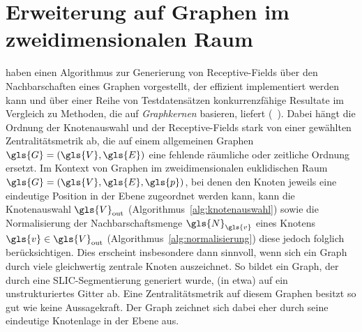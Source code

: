 \section{Erweiterung auf Graphen im zweidimensionalen Raum}
\label{raeumliche_erweiterung}

\citeauthor{patchy} haben einen Algorithmus zur Generierung von Receptive-Fields über den Nachbarschaften eines Graphen vorgestellt, der effizient implementiert werden kann und über einer Reihe von Testdatensätzen konkurrenzfähige Resultate im Vergleich zu Methoden, die auf \emph{Graphkernen} basieren, liefert (\vgl{}~\cite{patchy}).
Dabei hängt die Ordnung der Knotenauswahl und der Receptive-Fields stark von einer gewählten Zentralitätsmetrik ab, die auf einem allgemeinen Graphen $\gls{G} = \left(\gls{V}, \gls{E}\right)$ eine fehlende räumliche oder zeitliche Ordnung ersetzt.
Im Kontext von Graphen im zweidimensionalen euklidischen Raum $\gls{G} = \left(\gls{V}, \gls{E}, \gls{p}\right)$, bei denen den Knoten jeweils eine eindeutige Position in der Ebene zugeordnet werden kann, kann die Knotenauswahl $\gls{V}_{\mathrm{out}}$ (Algorithmus~\ref{alg:knotenauswahl}) sowie die Normalisierung der Nachbarschaftsmenge $\gls{N}_{\gls{v}}$ eines Knotens $\gls{v} \in \gls{V}_{\mathrm{out}}$ (Algorithmus~\ref{alg:normalisierung}) diese jedoch folglich berücksichtigen.
Dies erscheint insbesondere dann sinnvoll, wenn sich ein Graph durch viele gleichwertig zentrale Knoten auszeichnet.
So bildet ein Graph, der durch eine \gls{SLIC}-Segmentierung generiert wurde, (in etwa) auf ein unstrukturiertes Gitter ab.
Eine Zentralitätsmetrik auf diesem Graphen besitzt so gut wie keine Aussagekraft.
Der Graph zeichnet sich dabei eher durch seine eindeutige Knotenlage in der Ebene aus.

